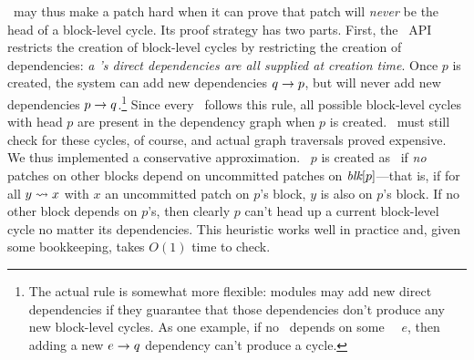 \Featherstitch\ may thus make a patch hard when it can prove that patch
 will \emph{never} be the head of a block-level cycle.
%
Its proof strategy has two parts.
%
First, the \Kudos\ API restricts the creation of block-level cycles by
 restricting the creation of dependencies:
%
\emph{a \patch's direct dependencies are all supplied at creation time}.
%
Once $p$ is created, the system can add new dependencies $q \rightarrow p$,
 but will never add new dependencies $p \rightarrow q$.\footnote{The actual
 rule is somewhat more flexible: modules may add new direct dependencies if
 they guarantee that those dependencies don't produce any new block-level
 cycles.  As one example, if no \patch\ depends on some \noop\ \patch\ $e$,
 then adding a new $e \rightarrow q$ dependency can't produce a cycle.}
%
Since every \patch\ follows this rule, all possible block-level cycles with
 head $p$ are present in the dependency graph when $p$ is created.
%
\Featherstitch\ must still check for these cycles, of course, and
%
actual graph traversals proved expensive.
%
We thus implemented a conservative approximation.
%
\Patch\ $p$ is
created as \nrb\ if \emph{no} patches on other blocks depend on uncommitted
 patches on $\textit{blk}[{p}]$---that is, if
%
for all $y \leadsto x$ with $x$ an uncommitted patch on $p$'s block,
 $y$ is also on $p$'s block.
%
If no other block depends on $p$'s, then clearly $p$ can't head up
 a current block-level cycle no matter its dependencies.
%
This heuristic works well in practice and, given some bookkeeping, 
 takes $O(1)$ time to check.


\begin{comment}
\Kudos\ further ensures that the dependency structure correctly
represents dependencies on the same block through overlap
dependencies: since \nrb\ \patches\ are considered to cover the entire
block, every succeeding \patch\ will overlap at least one \nrb\ \patch,
and \Kudos\ will automatically add a dependency.
%
(Some cases are handled by other optimizations.)


The buffer cache's ``write block'' behavior must account for \nrb\
\patches, as it \emph{must} write any \nrb\ \patches\ that exist on a
block.
%
Let $\PHard[b]$ be the set of \nrb\ \patches\ on block $b$.
%
Then to write block $b$, the buffer cache must choose some $P \subseteq
\PMem[b]$ with
%
\[ \PDepset{P} \subseteq P \cup \PDisk \text{ and } \PHard[b] \cap \PMem
\subseteq P. \]
%
If no such $P$ exists, then the cache must write a different block.
\end{comment}


